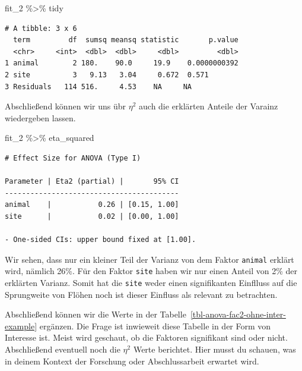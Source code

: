 \documentclass[
  letterpaper,
  DIV=11,
  oneside]{scrreport}
\newenvironment{Shaded}{\begin{snugshade}}{\end{snugshade}}
\newcommand{\NormalTok}[1]{\textcolor[rgb]{0.00,0.23,0.31}{#1}}
\newcommand{\SpecialCharTok}[1]{\textcolor[rgb]{0.37,0.37,0.37}{#1}}
\begin{document}
\begin{Shaded}
\begin{Highlighting}[]
\NormalTok{fit\_2 }\SpecialCharTok{\%\textgreater{}\%}\NormalTok{ tidy}
\end{Highlighting}
\end{Shaded}

\begin{verbatim}
# A tibble: 3 x 6
  term         df  sumsq meansq statistic       p.value
  <chr>     <int>  <dbl>  <dbl>     <dbl>         <dbl>
1 animal        2 180.    90.0     19.9    0.0000000392
2 site          3   9.13   3.04     0.672  0.571       
3 Residuals   114 516.     4.53    NA     NA           
\end{verbatim}

Abschließend können wir uns übr \(\eta^2\) auch die erklärten Anteile
der Varainz wiedergeben lassen.

\begin{Shaded}
\begin{Highlighting}[]
\NormalTok{fit\_2 }\SpecialCharTok{\%\textgreater{}\%}\NormalTok{ eta\_squared}
\end{Highlighting}
\end{Shaded}

\begin{verbatim}
# Effect Size for ANOVA (Type I)

Parameter | Eta2 (partial) |       95% CI
-----------------------------------------
animal    |           0.26 | [0.15, 1.00]
site      |           0.02 | [0.00, 1.00]

- One-sided CIs: upper bound fixed at [1.00].
\end{verbatim}

Wir sehen, dass nur ein kleiner Teil der Varianz von dem Faktor
\texttt{animal} erklärt wird, nämlich 26\%. Für den Faktor \texttt{site}
haben wir nur einen Anteil von 2\% der erklärten Varianz. Somit hat die
\texttt{site} weder einen signifikanten Einflluss auf die Sprungweite
von Flöhen noch ist dieser Einfluss als relevant zu betrachten.

Abschließend können wir die Werte in der
Tabelle~\ref{tbl-anova-fac2-ohne-inter-example} ergänzen. Die Frage ist
inwieweit diese Tabelle in der Form von Interesse ist. Meist wird
geschaut, ob die Faktoren signifikant sind oder nicht. Abschließend
eventuell noch die \(\eta^2\) Werte berichtet. Hier musst du schauen,
was in deinem Kontext der Forschung oder Abschlussarbeit erwartet wird.
\end{document}
